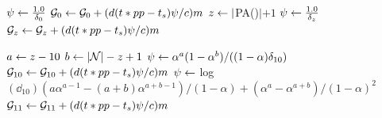 \begin{algorithm}
	\begin{algorithmic}[1]


				\State $ \psi \la \frac{1.0}{\dd_0}$
				\State $\G_0 \la \G_0 + (d(t * pp - t_s)\psi / c)  m$
			\Else
				\State $z \la |$\textsc{PA}(\N)$| + 1$
					\State $\psi \la \frac{1.0}{\dd_z}$
					\State $\G_z \la \G_z + (d(t * pp - t_s) \psi / c)  m$	
				\EndWhile
				
					\State $a \la z - 10$
					\State $b \la |\N| - z + 1$
					\State $\psi \la \alpha^a(1 - \alpha^b) / ((1 - \alpha)  \dd_{10})$ 
					\State $\G_{10} \la \G_{10} + (d(t * pp - t_s) \psi / c)  m$	
					\State $\psi \la$ log$(\dd_{10}) (a \alpha^{a-1} - (a + b)\alpha^{a + b-1}) / (1 - \alpha) + (\alpha^a - \alpha^{a + b}) / (1 - \alpha)^2$
					\State $\G_{11} \la \G_{11} + (d(t * pp - t_s)\psi / c)  m$	
				\EndIf
			\EndIf
		\EndIf
	\EndFunction

	\end{algorithmic}	
\end{algorithm}

